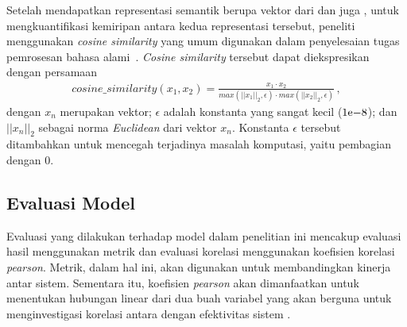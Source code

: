 Setelah mendapatkan representasi semantik berupa vektor dari \bert{} dan juga \tfive{}, untuk mengkuantifikasi kemiripan antara kedua representasi tersebut, peneliti menggunakan \textit{cosine similarity} yang umum digunakan dalam penyelesaian tugas pemrosesan bahasa alami~\citep{wehnert2021legal,zhou2022problems}. \textit{Cosine similarity} tersebut dapat diekspresikan dengan persamaan
\begin{align*}
    cosine\_similarity(x_1,x_2)=\frac{x_1\cdot{}x_2}{max(||x_1||_2,\epsilon{})\cdot{}max(||x_2||_2,\epsilon{})} \, ,
\end{align*}
dengan \(x_n\) merupakan vektor; \(\epsilon{}\) adalah konstanta yang sangat kecil (\({1}\mathrm{e}{-8}\)); dan \(||x_n||_2\) sebagai norma \textit{Euclidean} dari vektor \(x_n\). Konstanta \(\epsilon{}\) tersebut ditambahkan untuk mencegah terjadinya masalah komputasi, yaitu pembagian dengan 0.

\subsection{Evaluasi Model}
\label{subbab:3:Evaluasi Model}
Evaluasi yang dilakukan terhadap model dalam penelitian ini mencakup evaluasi hasil menggunakan metrik dan evaluasi korelasi menggunakan koefisien korelasi \textit{pearson}. Metrik, dalam hal ini, akan digunakan untuk membandingkan kinerja antar sistem. Sementara itu, koefisien \textit{pearson} akan dimanfaatkan untuk menentukan hubungan linear dari dua buah variabel yang akan berguna untuk menginvestigasi korelasi antara \cutoff{} dengan efektivitas sistem \ir{}.

